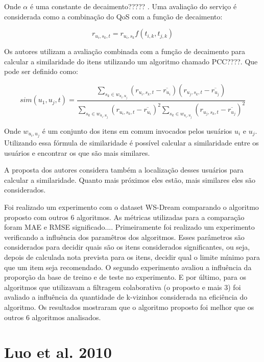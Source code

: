 Onde $\alpha$ é uma constante de decaimento????? . Uma avaliação do serviço é considerada como a combinação do QoS com
a função de decaimento:

\begin{equation}
  r_{u_i, s_k, t} = r_{u_i, s_k} f(t_{i,k}, t_{j,k})
  \label{eq:fan-avaliacao}
\end{equation}

Os autores utilizam a avaliação combinada com a função de decaimento para calcular a similaridade do itens utilizando
um algoritmo chamado PCC????. Que pode ser definido como:

\begin{equation}
  sim(u_1, u_j, t) = \frac{\sum_{s_k \in w_{u_i, u_j}}{(r_{u_i, s_k, t} - \overline{r_{u_i}})(r_{u_j, s_k, t} - \overline{r_{u_j}})}}{\sum_{s_k \in w_{u_i, u_j}}{(r_{u_i, s_k, t} - \overline{r_{u_i}})}^2 \sum_{s_k \in w_{u_i, u_j}}{(r_{u_j, s_k, t} - \overline{r_{u_j}})}^2}
  \label{eq:fan-avaliacao}
\end{equation}


Onde $w_{u_i, u_j}$ é um conjunto dos itens em comum invocados pelos usuários $u_i$ e $u_j$. Utilizando essa fórmula de
similaridade é possível calcular a similaridade entre os usuários e encontrar os que são mais similares.

A proposta dos autores considera também a localização desses usuários para calcular a similaridade. Quanto mais próximos
eles estão, mais similares eles são considerados.

Foi realizado um experimento com o dataset WS-Dream comparando o algoritmo proposto com outros 6 algoritmos. As
métricas utilizadas para a comparação foram MAE e RMSE significado.... Primeiramente foi realizado um experimento
verificando a influência dos paramêtros dos algoritmos. Esses parâmetros são considerados para decidir quais são os
itens considerados significantes, ou seja, depois de calculada nota prevista para os itens, decidir qual o limite mínimo
para que um item seja recomendado. O segundo experimento avaliou a influência da proporção da base de treino e de teste
no experimento. E por último, para os algoritmos que utilizavam a filtragem colaborativa (o proposto e mais 3) foi
avaliado a influência da quantidade de k-vizinhos considerada na eficiência do algoritmo. Os resultados mostraram que
o algoritmo proposto foi melhor que os outros 6 algoritmos analisados.

\section{Luo et al. 2010}

